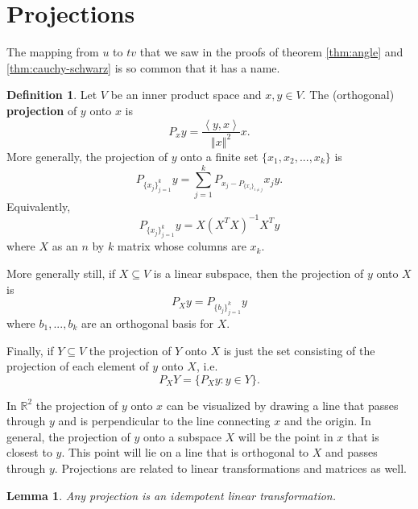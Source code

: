 \documentclass[12pt,reqno]{amsart}
\newtheorem{lemma}{Lemma}[section]
\theoremstyle{definition}
\newtheorem{definition}{Definition}[section]
\def\R{\mathbb{R}}
\newcommand{\iprod}[2]{\left\langle {#1} , {#2} \right\rangle}
\newcommand{\norm}[1]{\left\Vert {#1} \right\Vert}
\begin{document}
\section{Projections}
The mapping from $u$ to $tv$ that we saw in the proofs of theorem
\ref{thm:angle} and \ref{thm:cauchy-schwarz} is so common that it has
a name.
\begin{definition}
  Let $V$ be an inner product space and $x,y \in V$. The (orthogonal) 
  \textbf{projection} of $y$ onto $x$ is 
  \[ P_x y = \frac{\iprod{y}{x}}{\norm{x}^2} x. \]
  More generally, the projection of $y$ onto a finite set $\{x_1, x_2,
  ... , x_k\}$ is
  \[ P_{\{x_j\}_{j=1}^k} y = \sum_{j=1}^k P_{x_j - P_{\{x_i\}_{i \neq
        j}}} x_j y. \]
  Equivalently, 
  \[ P_{\{x_j\}_{j=1}^k} y = X (X^T X)^{-1} X^T y \]
  where $X$ as an $n$ by $k$ matrix whose columns are $x_k$. 
  
  More generally still, if $X \subseteq V$ is a linear subspace, then
  the projection of $y$ onto $X$ is
  \[ P_{X} y = P_{\{b_j\}_{j=1}^k} y \]
  where  $b_1, ..., b_k$ are an orthogonal basis for $X$. 
  
  Finally, if $Y \subseteq V$ the projection of $Y$ onto $X$ is just
  the set consisting of the projection of each element of $y$ onto
  $X$, i.e.
  \[ P_{X} Y = \{ P_{X} y : y \in Y \}. \]
\end{definition}
In $\R^2$ the projection of $y$ onto $x$ can be visualized by drawing
a line that passes through $y$ and is perpendicular to the line
connecting $x$ and the origin. In general, the projection of $y$
onto a subspace $X$ will be the point in $x$ that is closest to
$y$. This point will lie on a line that is orthogonal to $X$ and
passes through $y$. Projections are related to linear transformations
and matrices as well.
\begin{lemma}
  Any projection is an idempotent linear transformation. 
\end{lemma}
\end{document}
